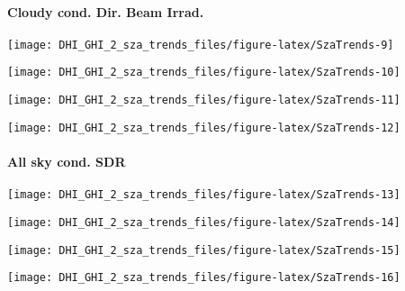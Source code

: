 \documentclass[
  10pt,
  a4paper,oneside]{article}
\begin{document}
\newpage

\hypertarget{cloudy-cond.-dir.-beam-irrad.}{%
\paragraph{Cloudy cond. Dir. Beam Irrad.}\label{cloudy-cond.-dir.-beam-irrad.}}

\begin{center}\texttt{[image: DHI\_GHI\_2\_sza\_trends\_files/figure-latex/SzaTrends-9]} \end{center}

\begin{center}\texttt{[image: DHI\_GHI\_2\_sza\_trends\_files/figure-latex/SzaTrends-10]} \end{center}

\begin{center}\texttt{[image: DHI\_GHI\_2\_sza\_trends\_files/figure-latex/SzaTrends-11]} \end{center}

\begin{center}\texttt{[image: DHI\_GHI\_2\_sza\_trends\_files/figure-latex/SzaTrends-12]} \end{center}

\newpage

\hypertarget{all-sky-cond.-sdr}{%
\paragraph{All sky cond. SDR}\label{all-sky-cond.-sdr}}

\begin{center}\texttt{[image: DHI\_GHI\_2\_sza\_trends\_files/figure-latex/SzaTrends-13]} \end{center}

\begin{center}\texttt{[image: DHI\_GHI\_2\_sza\_trends\_files/figure-latex/SzaTrends-14]} \end{center}

\begin{center}\texttt{[image: DHI\_GHI\_2\_sza\_trends\_files/figure-latex/SzaTrends-15]} \end{center}

\begin{center}\texttt{[image: DHI\_GHI\_2\_sza\_trends\_files/figure-latex/SzaTrends-16]} \end{center}
\end{document}
